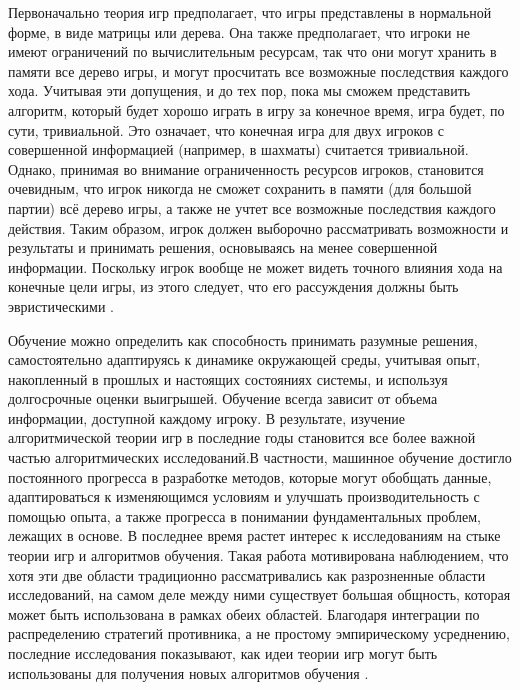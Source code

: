 Первоначально теория игр предполагает, что игры представлены в
нормальной форме, в виде матрицы или дерева. Она также предполагает, что
игроки не имеют ограничений по вычислительным ресурсам, так что они
могут хранить в памяти все дерево игры, и могут просчитать все возможные
последствия каждого хода. Учитывая эти допущения, и до тех пор, пока мы
сможем представить алгоритм, который будет хорошо играть в игру за
конечное время, игра будет, по сути, тривиальной. Это означает, что
конечная игра для двух игроков с совершенной информацией (например, в
шахматы) считается тривиальной. Однако, принимая во внимание
ограниченность ресурсов игроков, становится очевидным, что игрок никогда
не сможет сохранить в памяти (для большой партии) всё дерево игры, а
также не учтет все возможные последствия каждого действия. Таким
образом, игрок должен выборочно рассматривать возможности и результаты и
принимать решения, основываясь на менее совершенной информации.
Поскольку игрок вообще не может видеть точного влияния хода на конечные
цели игры, из этого следует, что его рассуждения должны быть
эвристическими \cite{Pell:1993}.

Обучение можно определить как способность принимать разумные решения,
самостоятельно адаптируясь к динамике окружающей среды, учитывая опыт,
накопленный в прошлых и настоящих состояниях системы, и используя
долгосрочные оценки выигрышей. Обучение всегда зависит от объема
информации, доступной каждому игроку. В результате, изучение
алгоритмической теории игр в последние годы становится все более важной
частью алгоритмических исследований.В частности, машинное обучение
достигло постоянного прогресса в разработке методов, которые могут
обобщать данные, адаптироваться к изменяющимся условиям и улучшать
производительность с помощью опыта, а также прогресса в понимании
фундаментальных проблем, лежащих в основе. В последнее время растет
интерес к исследованиям на стыке теории игр и алгоритмов обучения. Такая
работа мотивирована наблюдением, что хотя эти две области традиционно
рассматривались как разрозненные области исследований, на самом деле
между ними существует большая общность, которая может быть использована
в рамках обеих областей. Благодаря интеграции по распределению стратегий
противника, а не простому эмпирическому усреднению, последние
исследования показывают, как идеи теории игр могут быть использованы для
получения новых алгоритмов обучения \cite{Blum:2008}.

